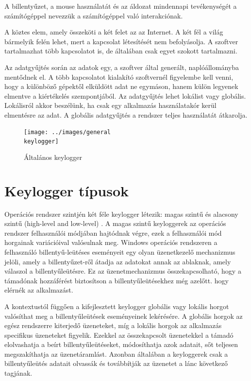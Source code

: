 \documentclass[12pt,a4paper,oneside]{report}
\begin{document}
A billentyűzet, a mouse használatát és az áldozat mindennapi tevékenységét a számítógéppel nevezzük a számítógéppel való interakciónak.

A köztes elem, amely összeköti a két felet az az Internet. A két fél a világ bármelyik felén lehet, mert a kapcsolat létesítését nem befolyásolja. A szoftver tartalmazhat több kapcsolatot is, de általában csak egyet szokott tartalmazni.

Az adatgyűjtés során az adatok egy, a szoftver által generált, naplóállományba mentődnek el. A több kapcsolatot kialakító szoftvernél figyelembe kell venni, hogy a különböző gépektől elküldött adat ne egymáson, hanem külön legyenek elmentve a kiértékelés szempontjából. Az adatgyűjtés lehet lokálist vagy globális. Lokálisról akkor beszélünk, ha csak egy alkalmazás használatakór kerül elmentésre az adat. A globális adatgyűjtés a rendszer teljes használatát átkarolja.

\begin{figure}[H]
\centering
\texttt{[image: ../images/general\\ keylogger]}
\caption{Általános keylogger}
\label{fig:genkeylogger}
\end{figure}

\section{Keylogger típusok}
Operációs rendszer szintjén két féle keylogger létezik: magas szintű és alacsony szintű (high-level and low-level) \cite{wood2010keyloggers}. A magas szintű keyloggerek az operációs rendszer felhasználói módjában hajtódnak végre, ezek a felhasználói mód horgainak variációival valósulnak meg. Windows operációs rendszeren a felhasználó billentyű-leütéses eseményeit egy olyan üzenetkezelő mechanizmus jelöli, amely a billentyűzet-ről átadja az adatokat annak az ablaknak, amely válaszol a billentyűleütésre. Ez az üzenetmechanizmus összekapcsolható, hogy a támadónak hozzáférést biztosítson a billentyűleütésekhez még azelőtt. hogy elérnék az alkalmazást.

A kontextustól függően a kifejlesztett keylogger globális vagy lokális horgot valósíthat meg a billentyűleütések eseményeinek lekérésére. A globális horgok az egész rendszerre kiterjedő üzeneteket, míg a lokális horgok az alkalmazás specifikus üzeneteket figyelik. Ezekkel az összekapcsolt üzenetekkel a támadó elolvashatja a beírt billentyűleütéseket, módosíthatja azok adatait, sőt teljesen megszakíthatja az üzenetáramlást. Azonban általában a keyloggerek csak a billentyűleütés adatait olvassák és továbbítják az üzenetet a lánc következő tagjának.
\end{document}

